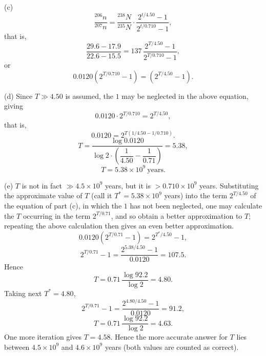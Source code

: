 (c)
\begin{equation*}
\frac{^{206}n}{^{207}n}
=\frac{^{238}N}{^{235}N}\cdot
\frac{2^{t/4.50}-1}{2^{t/0.710}-1} ,
\end{equation*}
that is,
\begin{equation*}
\frac{29.6-17.9}{22.6-15.5}
=137\,\frac{2^{T/4.50}-1}{2^{T/0.710}-1} ,
\end{equation*}
or
\begin{equation*}
0.0120\left(2^{T/0.710}-1\right)=\left(2^{T/4.50}-1\right).
\end{equation*}

(d) Since $T\gg4.50$ is assumed, the $1$ may be neglected in the above equation, giving
\begin{equation*}
0.0120\cdot2^{T/0.710}=2^{T/4.50} ,
\end{equation*}
that is,
\begin{equation*}
0.0120=2^{T(1/4.50-1/0.710)} .
\end{equation*}
\begin{equation*}
T=\frac{\log0.0120}{\log2\cdot\left(\dfrac{1}{4.50}-\dfrac{1}{0.71}\right)}=5.38 ,
\end{equation*}
\begin{equation*}
T=5.38\times10^{9}\ \text{years} .
\end{equation*}

(e) $T$ is not in fact $\gg4.5\times10^{9}$ years, but it is $>0.710\times10^{9}$ years. Substituting the approximate value of $T$ (call it $T^*=5.38\times10^{9}$ years) into the term $2^{T/4.50}$ of the equation of part (c), in which the $1$ has not been neglected, one may calculate the $T$ occurring in the term $2^{T/0.71}$, and so obtain a better approximation to $T$; repeating the above calculation then gives an even better approximation.
\begin{equation*}
0.0120\left(2^{T/0.71}-1\right)=2^{T^*/4.50}-1 ,
\end{equation*}
\begin{equation*}
2^{T/0.71}-1=\frac{2^{5.38/4.50}-1}{0.0120}=107.5 .
\end{equation*}
Hence
\begin{equation*}
T=0.71\,\frac{\log92.2}{\log2}=4.80 .
\end{equation*}
Taking next $T^*=4.80$,
\begin{equation*}
2^{T/0.71}-1=\frac{2^{4.80/4.50}-1}{0.0120}=91.2 ,
\end{equation*}
\begin{equation*}
T=0.71\,\frac{\log92.2}{\log2}=4.63 .
\end{equation*}
One more iteration gives $T=4.58$. Hence the more accurate answer for $T$ lies between $4.5\times10^{9}$ and $4.6\times10^{9}$ years (both values are counted as correct).

